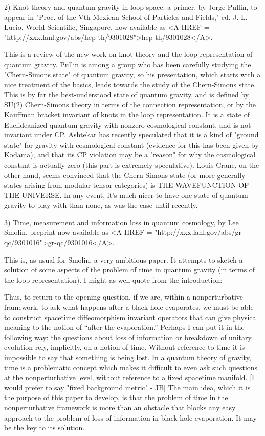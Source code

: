 2) Knot theory and quantum gravity in loop space: a primer, by Jorge
Pullin, to appear in "Proc. of the Vth Mexican School of Particles and
Fields," ed. J. L. Lucio, World Scientific, Singapore, now available
as <A HREF = "http://xxx.lanl.gov/abs/hep-th/9301028">hep-th/9301028</A>.

This is a review of the new work on knot theory and the loop representation
of quantum gravity.  Pullin is among a group who has been carefully
studying the "Chern-Simons state" of quantum gravity, so his presentation,
which starts with a nice treatment of the basics, leads towards the
study of the Chern-Simons state.   This is by far the best-understood state of 
quantum gravity, and is defined by SU(2) Chern-Simons theory in terms of the 
connection representation, or by the Kauffman bracket invariant of knots
in the  loop representation.  It is a state of Euclideanized quantum
gravity with  nonzero cosmological constant, and is not invariant under
CP.  Ashtekar has recently speculated that it is a kind of "ground
state" for gravity with  cosmological constant (evidence for this has
been given by Kodama), and that  its CP violation may be a "reason" for
why the cosmological constant is actually zero (this part is extremely
speculative).  Louis Crane, on the other hand, seems convinced that the
Chern-Simons state (or more generally states arising from modular tensor
categories) is THE WAVEFUNCTION OF THE UNIVERSE. In any event, it's much
nicer to have one state of quantum gravity to play with than none, as
was the case until recently.   

3) Time, measurement and information loss in quantum cosmology, by Lee
Smolin, preprint now available as <A HREF = "http://xxx.lanl.gov/abs/gr-qc/9301016">gr-qc/9301016</A>.  

This is, as usual for Smolin, a very ambitious paper.  It attempts to
sketch a solution of some aspects of the problem of time in quantum gravity 
(in terms of the loop representation).  I might as well quote from
the introduction:

Thus, to return to the opening question, if we are, within
a nonperturbative framework, to ask what happens after a black
hole evaporates, we must be able to construct spacetime diffeomorphism
invariant operators that can give physical meaning to the notion of
``after the evaporation.''  Perhaps I can put it in the following way:
the questions about loss of information or breakdown of unitary
evolution rely, implicitly, on a notion of time.  Without reference
to time it is impossible to say that something is being lost.
In a quantum theory of gravity, time is a problematic concept which makes 
it difficult to even ask such questions at the nonperturbative level,
without reference to a fixed spacetime manifold.  [I would prefer
to say "fixed background metric" - JB]  The main idea, which
it is the purpose of this paper to develop, is that the problem of time
in the nonperturbative framework is more than an obstacle that
blocks any easy approach to the problem of loss of information in black hole
evaporation.  It may be the key to its solution.


